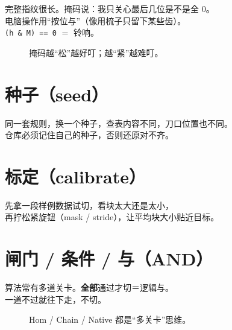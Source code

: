 \begin{metaphor}[只看电话号码后几位]
完整指纹很长。掩码说：我只关心最后几位是不是全 0。\\
电脑操作用``按位与''（像用梳子只留下某些齿）。\\
\texttt{(h \& M) == 0} $=$ 铃响。
\end{metaphor}

\begin{figure}[htbp]
\centering
{}
\caption{掩码越``松''越好叮；越``紧''越难叮。}
\label{fig:N-mask}
\end{figure}

\section{种子（seed）}

\begin{metaphor}[随机菜谱编号]
同一套规则，换一个种子，查表内容不同，刀口位置也不同。\\
仓库必须记住自己的种子，否则还原对不齐。
\end{metaphor}

\section{标定（calibrate）}

\begin{metaphor}[试切调整]
先拿一段样例数据试切，看块太大还是太小，\\
再拧松紧旋钮（mask / stride），让平均块大小贴近目标。
\end{metaphor}

\section{闸门 / 条件 / 与（AND）}

算法常有多道关卡。\textbf{全部}通过才切＝逻辑与。\\
一道不过就往下走，不切。

\begin{figure}[htbp]
\centering
{}
\caption{Hom / Chain / Native 都是``多关卡''思维。}
\label{fig:N-gates}
\end{figure}


